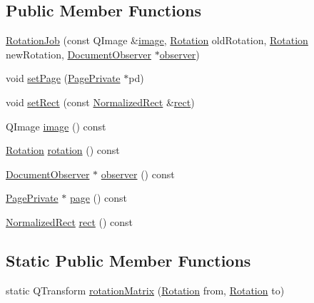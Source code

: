 \subsection*{Public Member Functions}
\begin{DoxyCompactItemize}
\item 
\hyperlink{classOkular_1_1RotationJob_a648ec5fe85483e6e8133db4ceb5f7e1a}{Rotation\+Job} (const Q\+Image \&\hyperlink{classOkular_1_1RotationJob_aac4f1232fd45b7d2131276b2d48f4089}{image}, \hyperlink{namespaceOkular_a8556d00465f61ef533c6b027669e7da6}{Rotation} old\+Rotation, \hyperlink{namespaceOkular_a8556d00465f61ef533c6b027669e7da6}{Rotation} new\+Rotation, \hyperlink{classOkular_1_1DocumentObserver}{Document\+Observer} $\ast$\hyperlink{classOkular_1_1RotationJob_a84430c25be56a8576230fb3c648f52f2}{observer})
\item 
void \hyperlink{classOkular_1_1RotationJob_addceb19a418c8de1c00c23c421253eb0}{set\+Page} (\hyperlink{classOkular_1_1PagePrivate}{Page\+Private} $\ast$pd)
\item 
void \hyperlink{classOkular_1_1RotationJob_a6b8b2159a1482c7887d83942e8f8a6b4}{set\+Rect} (const \hyperlink{classOkular_1_1NormalizedRect}{Normalized\+Rect} \&\hyperlink{classOkular_1_1RotationJob_a117c247923adfb34241a7f15bf783bfd}{rect})
\item 
Q\+Image \hyperlink{classOkular_1_1RotationJob_aac4f1232fd45b7d2131276b2d48f4089}{image} () const 
\item 
\hyperlink{namespaceOkular_a8556d00465f61ef533c6b027669e7da6}{Rotation} \hyperlink{classOkular_1_1RotationJob_a7cf5300ad4ee837c234bb6836f20f495}{rotation} () const 
\item 
\hyperlink{classOkular_1_1DocumentObserver}{Document\+Observer} $\ast$ \hyperlink{classOkular_1_1RotationJob_a84430c25be56a8576230fb3c648f52f2}{observer} () const 
\item 
\hyperlink{classOkular_1_1PagePrivate}{Page\+Private} $\ast$ \hyperlink{classOkular_1_1RotationJob_a04a8e8d13e86a325239aed98e9019895}{page} () const 
\item 
\hyperlink{classOkular_1_1NormalizedRect}{Normalized\+Rect} \hyperlink{classOkular_1_1RotationJob_a117c247923adfb34241a7f15bf783bfd}{rect} () const 
\end{DoxyCompactItemize}
\subsection*{Static Public Member Functions}
\begin{DoxyCompactItemize}
\item 
static Q\+Transform \hyperlink{classOkular_1_1RotationJob_a07c22589398445f27a3bcc6865da1733}{rotation\+Matrix} (\hyperlink{namespaceOkular_a8556d00465f61ef533c6b027669e7da6}{Rotation} from, \hyperlink{namespaceOkular_a8556d00465f61ef533c6b027669e7da6}{Rotation} to)
\end{DoxyCompactItemize}

